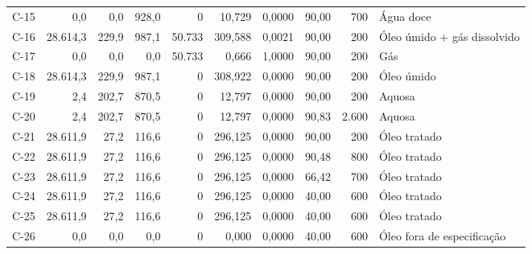 \documentclass[11pt,a4paper]{article}
\numberwithin{equation}{section}
\numberwithin{table}{section}
\numberwithin{figure}{section}
\begin{document}
{\begin{longtable}{lrrrrrrrrL{2.5cm}}
C-15 & 0,0 & 0,0 & 928,0 & 0 & 10,729 & 0,0000 & 90,00 & 700 & {\scriptsize Água doce}\\
C-16 & 28.614,3 & 229,9 & 987,1 & 50.733 & 309,588 & 0,0021 & 90,00 & 200 & {\scriptsize Óleo úmido + gás dissolvido}\\
C-17 & 0,0 & 0,0 & 0,0 & 50.733 & 0,666 & 1,0000 & 90,00 & 200 & {\scriptsize Gás}\\
C-18 & 28.614,3 & 229,9 & 987,1 & 0 & 308,922 & 0,0000 & 90,00 & 200 & {\scriptsize Óleo úmido}\\
C-19 & 2,4 & 202,7 & 870,5 & 0 & 12,797 & 0,0000 & 90,00 & 200 & {\scriptsize Aquosa}\\
C-20 & 2,4 & 202,7 & 870,5 & 0 & 12,797 & 0,0000 & 90,83 & 2.600 & {\scriptsize Aquosa}\\
C-21 & 28.611,9 & 27,2 & 116,6 & 0 & 296,125 & 0,0000 & 90,00 & 200 & {\scriptsize Óleo tratado}\\
C-22 & 28.611,9 & 27,2 & 116,6 & 0 & 296,125 & 0,0000 & 90,48 & 800 & {\scriptsize Óleo tratado}\\
C-23 & 28.611,9 & 27,2 & 116,6 & 0 & 296,125 & 0,0000 & 66,42 & 700 & {\scriptsize Óleo tratado}\\
C-24 & 28.611,9 & 27,2 & 116,6 & 0 & 296,125 & 0,0000 & 40,00 & 600 & {\scriptsize Óleo tratado}\\
C-25 & 28.611,9 & 27,2 & 116,6 & 0 & 296,125 & 0,0000 & 40,00 & 600 & {\scriptsize Óleo tratado}\\
C-26 & 0,0 & 0,0 & 0,0 & 0 & 0,000 & 0,0000 & 40,00 & 600 & {\scriptsize Óleo fora de especificação}\\
\bottomrule\end{longtable}}
\end{document}
